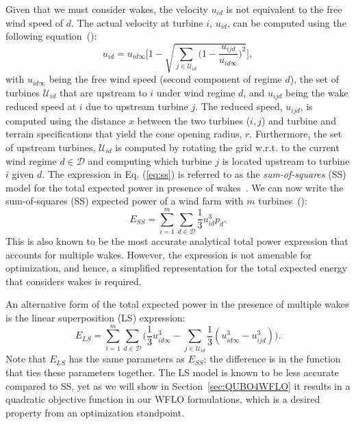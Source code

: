 \documentclass[preprint,12pt]{elsarticle}
\begin{document}
Given that we must consider wakes, the velocity $u_{id}$ is not equivalent to the free wind speed of $d$.
The actual velocity at turbine $i$, $u_{id}$, can be computed using the following equation~(\cite{Zhang2014}):
\begin{equation}
u_{id} = u_{id\infty} \Bigg[1 - \sqrt{\sum_{j\in\mathcal{U}_{id}} \bigg( 1-\frac{u_{ijd}}{u_{id\infty}} \bigg)^2}  \Bigg], \label{eq:ss}
\end{equation} with $u_{id\infty}$ being the free wind speed (second component of regime $d$), the set of turbines $\mathcal{U}_{id}$ that are upstream to $i$ 
under wind regime $d$, and $u_{ijd}$ being the wake 
reduced speed at $i$ due to upstream turbine $j$. 
The reduced speed, $u_{ijd}$, is computed using the distance $x$ between the two turbines ($i,j$)  and turbine and terrain specifications that yield the cone opening radius, $r$. Furthermore, the set of upstream turbines, $\mathcal{U}_{id}$ is computed  
by rotating the grid w.r.t. to the current wind regime $d \in \mathcal{D}$ and computing which turbine $j$ is located upstream to turbine $i$ given $d$. The expression in Eq. (\ref{eq:ss}) is referred to as the \emph{sum-of-squares} (SS) model for 
the total expected power in presence of wakes~\cite{Zhang2014}.  We can now write 
the sum-of-squares (SS) expected power of a wind farm with $m$ turbines~(\cite{Zhang2014}): \begin{equation} E_{SS} = \sum_{i=1}^m \sum_{d\in\mathcal{D}} \frac{1}{3} u_{id}^3p_d. \end{equation} This is also known to be the most accurate analytical total power expression that accounts for multiple wakes. However, the expression is not amenable for optimization, and hence, a simplified representation for the total expected energy that considers wakes is required. 

An alternative 
form of the total expected power in the presence of multiple wakes is the linear superposition (LS) expression: \begin{equation} \label{eq:ls}
E_{LS} = \sum_{i=1}^m \sum_{d\in\mathcal{D}} \Bigg(\frac{1}{3}u_{id\infty}^3 -\sum_{j\in\mathcal{U}_{id}} \frac{1}{3}(u_{id\infty}^3 - u_{ijd}^3)\Bigg).
\end{equation} Note that $E_{LS}$ has the same parameters as $E_{SS}$; the difference is in the function that ties these parameters together. 
The LS model is known to be less accurate compared to SS, yet as we will show in Section~\ref{sec:QUBO4WFLO} it 
results in a quadratic objective function in our WFLO formulations, which is a desired property from an optimization standpoint.
 
\end{document}
